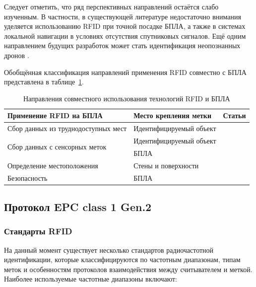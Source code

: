\documentclass[12pt]{article}
\theoremstyle{definition}
\begin{document}
Следует отметить, что ряд перспективных направлений остаётся слабо изученным. В частности, в существующей литературе недостаточно внимания уделяется использованию RFID при точной посадке БПЛА, а также в системах локальной навигации в условиях отсутствия спутниковых сигналов. Ещё одним направлением будущих разработок может стать идентификация неопознанных дронов \cite{Alam2023, Basak2022, Sazdic-Jotic2022, Khan2022}.

Обобщённая классификация направлений применения RFID совместно с БПЛА представлена в таблице~\ref{table:UAV}.

\begin{table}[]
\renewcommand{\arraystretch}{1.2}
\begin{tabular}{|p{4.5cm}|p{4.2cm}|p{6.2cm}|}
\hline
\textbf{Применение RFID на БПЛА} & \textbf{Место крепления метки} & \textbf{Статьи} \\ \hline
Сбор данных из труднодоступных мест & Идентифицируемый объект & \cite{Quino2021,Quino2022,Yang2017,Longhi2016,Longhi2017,Casati2017,LeBreton2024,Abramian2022,Choi2023, Mohsan2023} \\ \hline
\multirow{2}{=}{Сбор данных с сенсорных меток} & Идентифицируемый объект & \cite{Almalki2020,Gortschacher2019,Wang2015,Longhi2017a,Abramian2024,Kudyba2025,Mulloni2024} \\ \cline{2-3}
& БПЛА & \cite{Longhi2016,Longhi2017} \\ \hline
Определение местоположения & Стены и поверхности & \cite{Buffi2017,Buffi2018,Buffi2018a,Buffi2019,Habaebi2020,Li2021,Wu2019,Aouladhadj2023} \\ \hline
Безопасность & БПЛА & \cite{Gope2021,Shariq2024, Alam2023, Basak2022, Sazdic-Jotic2022, Khan2022} \\ \hline
\end{tabular}
\caption{Направления совместного использования технологий RFID и БПЛА}
\label{table:UAV}
\end{table}


\subsection{Протокол EPC class 1 Gen.2}
\label{sec:EPCclass1Gen2}

\subsubsection{Стандарты RFID}

На данный момент существует несколько стандартов радиочастотной идентификации, которые классифицируются по частотным диапазонам, типам меток и особенностям протоколов взаимодействия между считывателем и меткой. Наиболее используемые частотные диапазоны включают:
\end{document}
